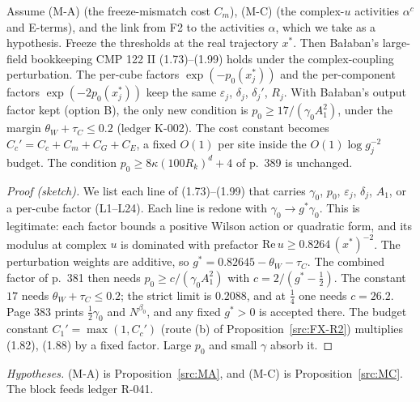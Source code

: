 \begin{proposition}\label{src:MB}
Assume (M-A) (the freeze-mismatch cost $C_m$), (M-C) (the complex-$u$ activities $\alpha^c$ and E-terms), and the link from F2 to the activities $\alpha$, which we take as a hypothesis. Freeze the thresholds at the real trajectory $x^*$. Then Ba{\l}aban's large-field bookkeeping CMP 122 II (1.73)--(1.99) holds under the complex-coupling perturbation. The per-cube factors $\exp(-p_0(x^*_j))$ and the per-component factors $\exp(-2p_0(x^*_j))$ keep the same $\varepsilon_j$, $\delta_j$, $\delta_j'$, $R_j$. With Ba{\l}aban's output factor kept (option B), the only new condition is $p_0\ge17/(\gamma_0A_1^2)$, under the margin $\theta_W+\tau_C\le0.2$ (ledger K-002). The cost constant becomes $C_c'=C_c+C_m+C_G+C_E$, a fixed $O(1)$ per site inside the $O(1)\log g_j^{-2}$ budget. The condition $p_0\ge8\kappa(100R_k)^d+4$ of p.~389 is unchanged.
\end{proposition}
\begin{proof}[Proof (sketch)]
We list each line of (1.73)--(1.99) that carries $\gamma_0$, $p_0$, $\varepsilon_j$, $\delta_j$, $A_1$, or a per-cube factor (L1--L24). Each line is redone with $\gamma_0\to g^*\gamma_0$. This is legitimate: each factor bounds a positive Wilson action or quadratic form, and its modulus at complex $u$ is dominated with prefactor $\mathrm{Re}\,u\ge0.8264\,(x^*)^{-2}$. The perturbation weights are additive, so $g^*=0.82645-\theta_W-\tau_C$. The combined factor of p.~381 then needs $p_0\ge c/(\gamma_0A_1^2)$ with $c=2/(g^*-\tfrac12)$. The constant $17$ needs $\theta_W+\tau_C\le0.2$; the strict limit is $0.2088$, and at $\tfrac14$ one needs $c=26.2$. Page 383 prints $\tfrac12\gamma_0$ and $N^{\beta_0}$, and any fixed $g^*>0$ is accepted there. The budget constant $C_1'=\max(1,C_c')$ (route (b) of Proposition~\ref{src:FX-R2}) multiplies (1.82), (1.88) by a fixed factor. Large $p_0$ and small $\gamma$ absorb it.
\end{proof}
\emph{Hypotheses.} (M-A) is Proposition~\ref{src:MA}, and (M-C) is Proposition~\ref{src:MC}. The block feeds ledger R-041.


